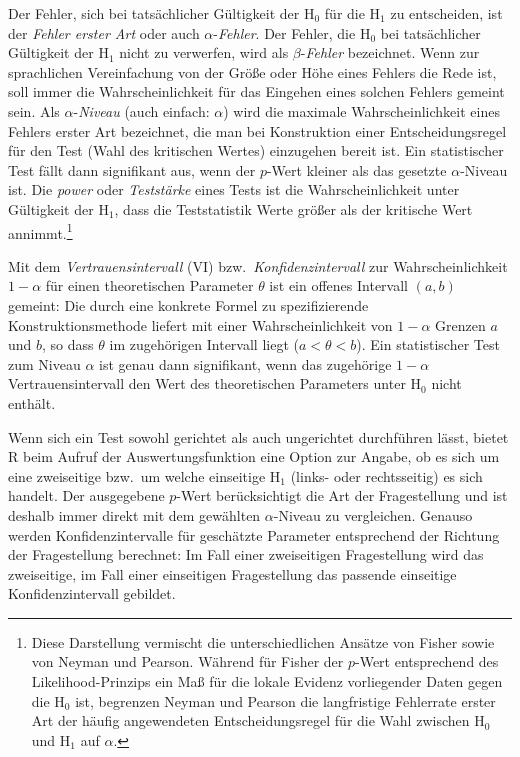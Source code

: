 Der Fehler, sich bei tatsächlicher Gültigkeit der $\text{H}_{0}$ für die $\text{H}_{1}$ zu entscheiden, ist der \emph{Fehler erster Art} oder auch $\alpha$-\emph{Fehler}. Der Fehler, die $\text{H}_{0}$ bei tatsächlicher Gültigkeit der $\text{H}_{1}$ nicht zu verwerfen, wird als $\beta$-\emph{Fehler} bezeichnet. Wenn zur sprachlichen Vereinfachung von der Größe oder Höhe eines Fehlers die Rede ist, soll immer die Wahrscheinlichkeit für das Eingehen eines solchen Fehlers gemeint sein. Als $\alpha$-\emph{Niveau} (auch einfach: $\alpha$) wird die maximale Wahrscheinlichkeit eines Fehlers erster Art bezeichnet, die man bei Konstruktion einer Entscheidungsregel für den Test (Wahl des kritischen Wertes) einzugehen bereit ist. Ein statistischer Test fällt dann signifikant aus, wenn der $p$-Wert kleiner als das gesetzte $\alpha$-Niveau ist. Die \emph{power} oder \emph{Teststärke} eines Tests ist die Wahrscheinlichkeit unter Gültigkeit der $\text{H}_{1}$, dass die Teststatistik Werte größer als der kritische Wert annimmt.\footnote{Diese Darstellung vermischt die unterschiedlichen Ansätze von Fisher sowie von Neyman und Pearson. Während für Fisher der $p$-Wert entsprechend des Likelihood-Prinzips ein Maß für die lokale Evidenz vorliegender Daten gegen die $\text{H}_{0}$ ist, begrenzen Neyman und Pearson die langfristige Fehlerrate erster Art der häufig angewendeten Entscheidungsregel für die Wahl zwischen $\text{H}_{0}$ und $\text{H}_{1}$ auf $\alpha$.}

Mit dem \emph{Vertrauensintervall} (VI) bzw.\ \emph{Konfidenzintervall} zur Wahrscheinlichkeit $1-\alpha$ für einen theoretischen Parameter $\theta$ ist ein offenes Intervall $(a, b)$ gemeint: Die durch eine konkrete Formel zu spezifizierende Konstruktionsmethode liefert mit einer Wahrscheinlichkeit von $1-\alpha$ Grenzen $a$ und $b$, so dass $\theta$ im zugehörigen Intervall liegt ($a < \theta < b$). Ein statistischer Test zum Niveau $\alpha$ ist genau dann signifikant, wenn das zugehörige $1-\alpha$ Vertrauensintervall den Wert des theoretischen Parameters unter $\text{H}_{0}$ nicht enthält.

Wenn sich ein Test sowohl gerichtet als auch ungerichtet durchführen lässt, bietet R beim Aufruf der Auswertungsfunktion eine Option zur Angabe, ob es sich um eine zweiseitige bzw.\ um welche einseitige $\text{H}_{1}$ (links- oder rechtsseitig) es sich handelt. Der ausgegebene $p$-Wert berücksichtigt die Art der Fragestellung und ist deshalb immer direkt mit dem gewählten $\alpha$-Niveau zu vergleichen. Genauso werden Konfidenzintervalle für geschätzte Parameter entsprechend der Richtung der Fragestellung berechnet: Im Fall einer zweiseitigen Fragestellung wird das zweiseitige, im Fall einer einseitigen Fragestellung das passende einseitige Konfidenzintervall gebildet.

